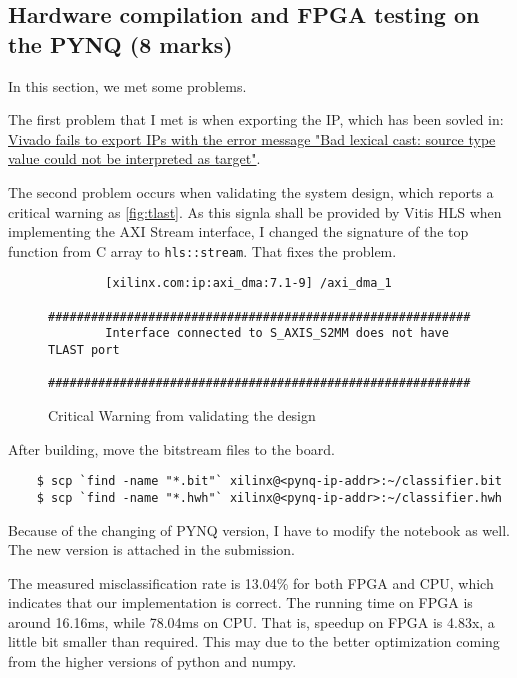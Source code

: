 \subsection{Hardware compilation and FPGA testing on the PYNQ (8 marks)}\label{sec:1f}

In this section, we met some problems.

The first problem that I met is when exporting the IP, which has been sovled in: \href{https://support.xilinx.com/s/question/0D52E00006uxy49SAA/vivado-fails-to-export-ips-with-the-error-message-bad-lexical-cast-source-type-value-could-not-be-interpreted-as-target}{Vivado fails to export IPs with the error message "Bad lexical cast: source type value could not be interpreted as target"}.

The second problem occurs when validating the system design, which reports a critical warning as \autoref{fig:tlast}.
As this signla shall be provided by Vitis HLS when implementing the AXI Stream interface, I changed the signature of the top function from C array to \texttt{hls::stream}.
That fixes the problem.

\begin{figure}
    \begin{verbatim}
        [xilinx.com:ip:axi_dma:7.1-9] /axi_dma_1
        ###########################################################
        Interface connected to S_AXIS_S2MM does not have TLAST port
        ###########################################################
    \end{verbatim}
    \caption{Critical Warning from validating the design}
    \label{fig:tlast}
\end{figure}

After building, move the bitstream files to the board.

\begin{verbatim}
    $ scp `find -name "*.bit"` xilinx@<pynq-ip-addr>:~/classifier.bit
    $ scp `find -name "*.hwh"` xilinx@<pynq-ip-addr>:~/classifier.hwh
\end{verbatim}

Because of the changing of PYNQ version, I have to modify the notebook as well.
The new version is attached in the submission.

The measured misclassification rate is 13.04\% for both FPGA and CPU, which indicates that our implementation is correct.
The running time on FPGA is around 16.16ms, while 78.04ms on CPU.
That is, speedup on FPGA is 4.83x, a little bit smaller than required.
This may due to the better optimization coming from the higher versions of python and numpy.

